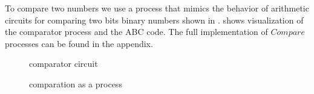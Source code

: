 To compare two numbers we use a process that mimics the behavior of arithmetic circuits for comparing two bits binary numbers shown in 
.
 shows visualization of the comparator process and the ABC code.
The full implementation of $Compare$ processes can be found in the appendix.
\begin{figure}[H]%
\centering
{}
\caption{comparator circuit}
\label{tra_comparator_circuit}%
\end{figure}


\begin{figure}[H]%
\centering
{}%
\hspace{\fill}
%
\hspace{1em}%
%
\caption{comparation as a process}
\label{tra_comparation}%
\end{figure}
